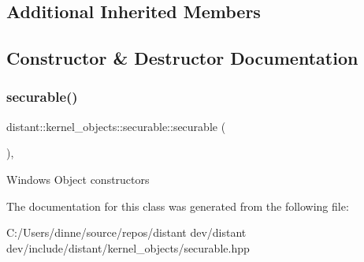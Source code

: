 \subsection*{Additional Inherited Members}


\subsection{Constructor \& Destructor Documentation}
\mbox{\label{classdistant_1_1kernel__objects_1_1securable_aec5d135541fe36243d7ec121e5bd36fa}} 
\subsubsection{\texorpdfstring{securable()}{securable()}}
{\footnotesize\ttfamily distant\+::kernel\+\_\+objects\+::securable\+::securable (\begin{DoxyParamCaption}{ }\end{DoxyParamCaption})\hspace{0.3cm}{\ttfamily [default]}, {\ttfamily [noexcept]}}

Windows Object constructors 

The documentation for this class was generated from the following file\+:\begin{DoxyCompactItemize}
\item 
C\+:/\+Users/dinne/source/repos/distant dev/distant dev/include/distant/kernel\+\_\+objects/securable.\+hpp\end{DoxyCompactItemize}
